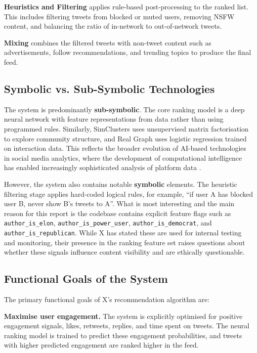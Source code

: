 \documentclass[]
{UCD_CS_41820_Report}
\begin{document}
\textbf{Heuristics and Filtering} applies rule-based post-processing to the ranked list. This includes filtering tweets from blocked or muted users, removing NSFW content, and balancing the ratio of in-network to out-of-network tweets.

\textbf{Mixing} combines the filtered tweets with non-tweet content such as advertisements, follow recommendations, and trending topics to produce the final feed.

\subsection{Symbolic vs. Sub-Symbolic Technologies}

The system is predominantly \textbf{sub-symbolic}. The core ranking model is a deep neural network with feature representations from data rather than using programmed rules. Similarly, SimClusters uses unsupervised matrix factorisation to explore community structure, and Real Graph uses logistic regression trained on interaction data. This reflects the broader evolution of AI-based technologies in social media analytics, where the development of computational intelligence has enabled increasingly sophisticated analysis of platform data \cite{nedjah2022, moreno2016}.

However, the system also contains notable \textbf{symbolic} elements. The heuristic filtering stage applies hard-coded logical rules, for example, ``if user A has blocked user B, never show B's tweets to A''. What is most interesting and the main reason for this report is the codebase contains explicit feature flags such as \texttt{author\_is\_elon}, \texttt{author\_is\_power\_user}, \texttt{author\_is\_democrat}, and \texttt{author\_is\_republican}. While X has stated these are used for internal testing and monitoring, their presence in the ranking feature set raises questions about whether these signals influence content visibility and are ethically questionable.

\subsection{Functional Goals of the System}

The primary functional goals of X's recommendation algorithm are:

\textbf{Maximise user engagement.} The system is explicitly optimised for positive engagement signals, likes, retweets, replies, and time spent on tweets. The neural ranking model is trained to predict these engagement probabilities, and tweets with higher predicted engagement are ranked higher in the feed.
\end{document}
